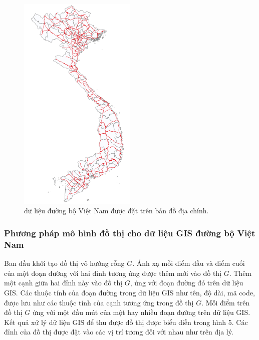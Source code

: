 \documentclass[14pt, oneside, a4paper, openany]{scrartcl}
\begin{document}
\begin{figure}
\begin{minipage}{0.6\textwidth}
		\includegraphics[width=0.5\textwidth]{figures/vietnamroad03.png} %
		\caption[dữ liệu đường bộ Việt Nam được đặt trên bản đồ địa chính]{dữ liệu đường bộ Việt Nam được đặt trên bản đồ địa chính.}
	\end{minipage}
\end{figure}

\subsubsection{Phương pháp mô hình đồ thị cho dữ liệu GIS đường bộ Việt Nam}
Ban đầu khởi tạo đồ thị vô hướng rỗng $G$. Ánh xạ mỗi điểm đầu và điểm cuối của một đoạn đường với hai đỉnh tương ứng được thêm mới vào đồ thị $G$. Thêm một cạnh giữa hai đỉnh này vào đồ thị $G$, ứng với đoạn đường đó trên dữ liệu GIS. Các thuộc tính của đoạn đường trong dữ liệu GIS như tên, độ dài, mã code, được lưu như các thuộc tính của cạnh tương ứng trong đồ thị $G$.
Mỗi điểm trên đồ thị $G$ ứng với một đầu mút của một hay nhiều đoạn đường trên dữ liệu GIS.
Kết quả xử lý dữ liệu GIS để thu được đồ thị được biểu diễn trong hình 5. Các đỉnh của đồ thị được đặt vào các vị trí tương đối với nhau như trên địa lý.
\end{document}
